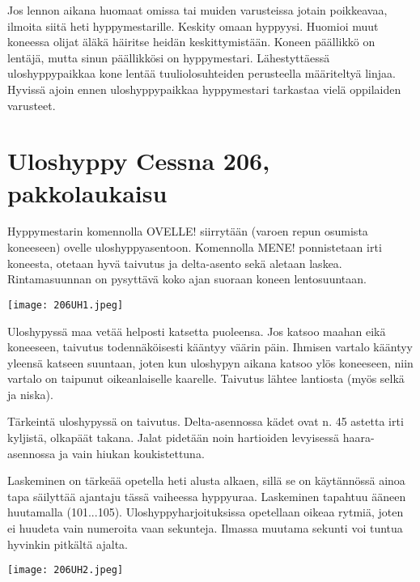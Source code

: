 Jos lennon aikana huomaat omissa tai muiden varusteissa jotain poikkeavaa, ilmoita siitä heti hyppymestarille. Keskity omaan hyppyysi. Huomioi muut koneessa olijat äläkä häiritse heidän keskittymistään. Koneen päällikkö on lentäjä, mutta sinun päällikkösi on hyppymestari. Lähestyttäessä uloshyppypaikkaa kone lentää tuuliolosuhteiden perusteella määriteltyä linjaa. Hyvissä ajoin ennen uloshyppypaikkaa hyppymestari tarkastaa vielä oppilaiden varusteet. 

\section{ Uloshyppy Cessna 206, pakkolaukaisu }
\label{hyppytapahtuma-uloshyppy-cessna-206-pakkolaukaisu}


Hyppymestarin komennolla OVELLE! siirrytään (varoen repun osumista koneeseen) ovelle uloshyppyasentoon. Komennolla MENE! ponnistetaan irti koneesta, otetaan hyvä taivutus ja delta-asento sekä aletaan laskea. Rintamasuunnan on pysyttävä koko ajan suoraan koneen lentosuuntaan. 


\begin{Figure}\centering\texttt{[image: 206UH1.jpeg]}\end{Figure} 


Uloshypyssä maa vetää helposti katsetta puoleensa. Jos katsoo maahan eikä koneeseen, taivutus todennäköisesti kääntyy väärin päin. Ihmisen vartalo kääntyy yleensä katseen suuntaan, joten kun uloshypyn aikana katsoo ylös koneeseen, niin vartalo on taipunut oikeanlaiselle kaarelle. Taivutus lähtee lantiosta (myös selkä ja niska). 


Tärkeintä uloshypyssä on taivutus. Delta-asennossa kädet ovat n. 45 astetta irti kyljistä, olkapäät takana. Jalat pidetään noin hartioiden levyisessä haara-asennossa ja vain hiukan koukistettuna. 


Laskeminen on tärkeää opetella heti alusta alkaen, sillä se on käytännössä ainoa tapa säilyttää ajantaju tässä vaiheessa hyppyuraa. Laskeminen tapahtuu ääneen huutamalla (101...105). Uloshyppyharjoituksissa opetellaan oikeaa rytmiä, joten ei huudeta vain numeroita vaan sekunteja. Ilmassa muutama sekunti voi tuntua hyvinkin pitkältä ajalta. 


\begin{Figure}\centering\texttt{[image: 206UH2.jpeg]}\end{Figure} 


